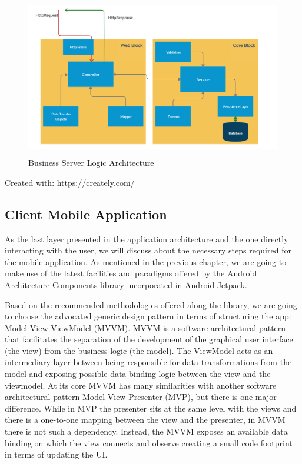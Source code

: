 \begin{figure}[H]
\centering
\includegraphics[height=7cm]{images/BusinessServerArchitecture.png} 
\caption{Business Server Logic Architecture}
\label{fig:businessserverarchitecture}
\end{figure}
\begin{flushright}
Created with: https://creately.com/
\end{flushright}




\subsection{Client Mobile Application}

As the last layer presented in the application architecture and the one directly interacting with the user, we will discuss about the necessary steps required for the mobile application. As mentioned in the previous chapter, we are going to make use of the latest facilities and paradigms offered by the Android Architecture Components library incorporated in Android Jetpack.

Based on the recommended methodologies offered along the library, we are going to choose the advocated generic design pattern in terms of structuring the app: Model-View-ViewModel (MVVM). MVVM is a software architectural pattern that facilitates the separation of the development of the graphical user interface (the view) from the business logic (the model). The ViewModel acts as an intermediary layer between being responsible for data transformations from the model and exposing possible data binding logic between the view and the viewmodel. At its core MVVM has many similarities with another software architectural pattern Model-View-Presenter (MVP), but there is one major difference. While in MVP the presenter sits at the same level with the views and there is a one-to-one mapping between the view and the presenter, in MVVM there is not such a dependency. Instead, the MVVM exposes an available data binding on which the view connects and observe creating a small code footprint in terms of updating the UI.

